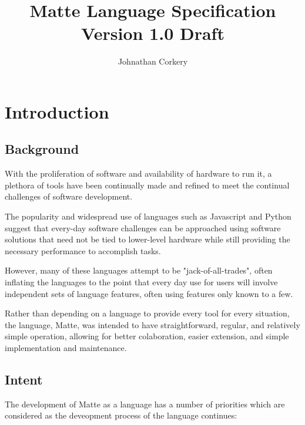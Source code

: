 \documentclass[12pt,letterpaper]{report}
\author{Johnathan Corkery}
\title{Matte Language Specification\\
\small Version 1.0 Draft
}
\begin{document}
\maketitle
\tableofcontents


\chapter{Introduction}\label{Introduction}
\section{Background}\label{Background}

With the proliferation of software and availability of hardware to run it, a
plethora of tools have been continually made and refined to meet the 
continual challenges of software development. 

The popularity and widespread use of languages such as Javascript and 
Python suggest that every-day software challenges can be approached using 
software solutions that need not be tied to lower-level hardware while 
still providing the necessary performance to accomplish tasks.

However, many of these languages attempt to be "jack-of-all-trades", often 
inflating the languages to the point that every day use for users will involve
independent sets of language features, often using features only known to a few.

Rather than depending on a language to provide every tool for every situation,
the language, Matte, was intended to have straightforward, regular, and 
relatively simple operation, allowing for better colaboration, easier 
extension, and simple implementation and maintenance.
  
\section{Intent}\label{Intent}

The development of Matte as a language has a number of priorities which are 
considered as the deveopment process of the language continues:
\end{document}
